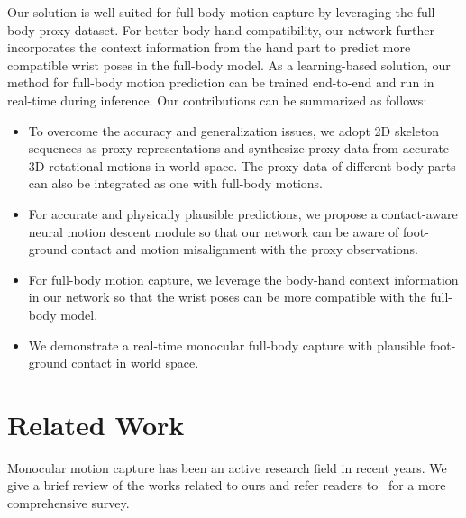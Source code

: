 \documentclass[10pt,twocolumn,letterpaper]{article}
\begin{document}
Our solution is well-suited for full-body motion capture by leveraging the full-body proxy dataset.
For better body-hand compatibility, our network further incorporates the context information from the hand part to predict more compatible wrist poses in the full-body model.
As a learning-based solution, our method for full-body motion prediction can be trained end-to-end and run in real-time during inference. Our contributions can be summarized as follows:
\begin{itemize}[leftmargin=*]
\itemsep0em 
    \item To overcome the accuracy and generalization issues, we adopt 2D skeleton sequences as proxy representations and synthesize proxy data from accurate 3D rotational motions in world space. The proxy data of different body parts can also be integrated as one with full-body motions.
\item For accurate and physically plausible predictions, we propose a contact-aware neural motion descent module so that our network can be aware of foot-ground contact and motion misalignment with the proxy observations.
\item For full-body motion capture, we leverage the body-hand context information in our network so that the wrist poses can be more compatible with the full-body model.
\item We demonstrate a real-time monocular full-body capture with plausible foot-ground contact in world space.
\end{itemize}


















 

\section{Related Work}

Monocular motion capture has been an active research field in recent years.
We give a brief review of the works related to ours and refer readers to~\cite{tian2022recovering} for a more comprehensive survey.
\end{document}

